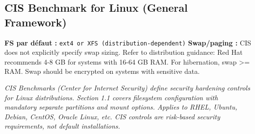 \documentclass[10pt,a4paper]{article}
\begin{document}
\subsection{CIS Benchmark for Linux (General Framework)}
\noindent\small \textbf{FS par d\'efaut :} \texttt{ext4 or XFS (distribution-dependent)} \quad\textbullet\quad \textbf{Swap/paging :} CIS does not explicitly specify swap sizing. Refer to distribution guidance: Red Hat recommends 4-8 GB for systems with 16-64 GB RAM. For hibernation, swap >= RAM. Swap should be encrypted on systems with sensitive data.\normalsize\par\smallskip
\noindent\small\textit{CIS Benchmarks (Center for Internet Security) define security hardening controls for Linux distributions. Section 1.1 covers filesystem configuration with mandatory separate partitions and mount options. Applies to RHEL, Ubuntu, Debian, CentOS, Oracle Linux, etc. CIS controls are risk-based security requirements, not default installations.}\normalsize\par\smallskip
\end{document}
